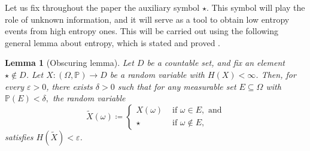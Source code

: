 \documentclass[reqno,oneside,11pt]{amsart}
\renewcommand{\P}{\mathbb{P}}
\theoremstyle{plain}
\newtheorem{lem}[thm]{Lemma}
\theoremstyle{definition}
\begin{document}
Let us fix throughout the paper the auxiliary symbol $\star$. This symbol will play the role of unknown information, and it will serve as a tool to obtain low entropy events from high entropy ones. This will be carried out using the following general lemma about entropy, which is stated and proved \cite[Lemma 2.4]{ChawlaForghaniFrischTiozzo2022}.
\begin{lem}[Obscuring lemma]\label{lem: obscuring values of random variable}
	Let $D$ be a countable set, and fix an element $\star\notin D$. Let $X:(\Omega,\P)\to D$ be a random variable with $H(X)<\infty$. Then, for every $\varepsilon>0$, there exists $\delta>0$ such that for any measurable set $E\subseteq \Omega$ with $\P(E)<\delta,$ the random variable
	\begin{equation*}\label{eq: obscured random variable}
		\widetilde{X}(\omega)\coloneqq\begin{cases}
			X(\omega)&\text{ if }\omega\in E, \text{ and}\\
			\star&\text{ if }\omega\notin E,
		\end{cases}
	\end{equation*}
	satisfies $H(\widetilde{X})<\varepsilon$.
\end{lem}

\end{document}
